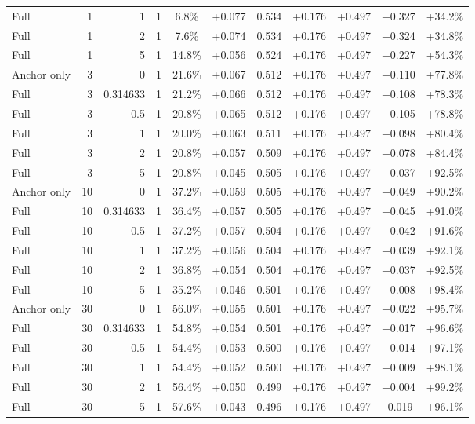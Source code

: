 \begin{table}[htbp]
\begin{tabular}{lrrrccccccc}
Full & 1 & 1 & 1 & 6.8\% & +0.077 & 0.534 & +0.176 & +0.497 & +0.327 & +34.2\% \\
Full & 1 & 2 & 1 & 7.6\% & +0.074 & 0.534 & +0.176 & +0.497 & +0.324 & +34.8\% \\
Full & 1 & 5 & 1 & 14.8\% & +0.056 & 0.524 & +0.176 & +0.497 & +0.227 & +54.3\% \\
Anchor only & 3 & 0 & 1 & 21.6\% & +0.067 & 0.512 & +0.176 & +0.497 & +0.110 & +77.8\% \\
Full & 3 & 0.314633 & 1 & 21.2\% & +0.066 & 0.512 & +0.176 & +0.497 & +0.108 & +78.3\% \\
Full & 3 & 0.5 & 1 & 20.8\% & +0.065 & 0.512 & +0.176 & +0.497 & +0.105 & +78.8\% \\
Full & 3 & 1 & 1 & 20.0\% & +0.063 & 0.511 & +0.176 & +0.497 & +0.098 & +80.4\% \\
Full & 3 & 2 & 1 & 20.8\% & +0.057 & 0.509 & +0.176 & +0.497 & +0.078 & +84.4\% \\
Full & 3 & 5 & 1 & 20.8\% & +0.045 & 0.505 & +0.176 & +0.497 & +0.037 & +92.5\% \\
Anchor only & 10 & 0 & 1 & 37.2\% & +0.059 & 0.505 & +0.176 & +0.497 & +0.049 & +90.2\% \\
Full & 10 & 0.314633 & 1 & 36.4\% & +0.057 & 0.505 & +0.176 & +0.497 & +0.045 & +91.0\% \\
Full & 10 & 0.5 & 1 & 37.2\% & +0.057 & 0.504 & +0.176 & +0.497 & +0.042 & +91.6\% \\
Full & 10 & 1 & 1 & 37.2\% & +0.056 & 0.504 & +0.176 & +0.497 & +0.039 & +92.1\% \\
Full & 10 & 2 & 1 & 36.8\% & +0.054 & 0.504 & +0.176 & +0.497 & +0.037 & +92.5\% \\
Full & 10 & 5 & 1 & 35.2\% & +0.046 & 0.501 & +0.176 & +0.497 & +0.008 & +98.4\% \\
Anchor only & 30 & 0 & 1 & 56.0\% & +0.055 & 0.501 & +0.176 & +0.497 & +0.022 & +95.7\% \\
Full & 30 & 0.314633 & 1 & 54.8\% & +0.054 & 0.501 & +0.176 & +0.497 & +0.017 & +96.6\% \\
Full & 30 & 0.5 & 1 & 54.4\% & +0.053 & 0.500 & +0.176 & +0.497 & +0.014 & +97.1\% \\
Full & 30 & 1 & 1 & 54.4\% & +0.052 & 0.500 & +0.176 & +0.497 & +0.009 & +98.1\% \\
Full & 30 & 2 & 1 & 56.4\% & +0.050 & 0.499 & +0.176 & +0.497 & +0.004 & +99.2\% \\
Full & 30 & 5 & 1 & 57.6\% & +0.043 & 0.496 & +0.176 & +0.497 & -0.019 & +96.1\% \\

\end{tabular}
\end{table}
